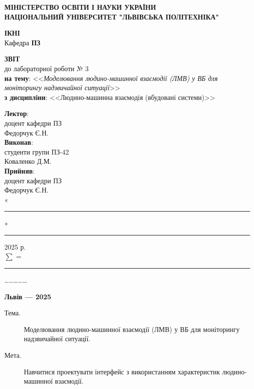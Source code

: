 \documentclass[14pt]{extreport}
\newcommand\subject{Людино-машинна взаємодія (вбудовані системи)}
\newcommand\lecturer{доцент кафедри ПЗ\\Федорчук Є.Н.}
\newcommand\teacher{доцент кафедри ПЗ\\Федорчук Є.Н.}
\newcommand\mygroup{ПЗ-42}
\newcommand\lab{3}
\newcommand\theme{Моделювання людино-машинної взаємодії (ЛМВ) у ВБ для
моніторингу надзвичайної ситуації}
\newcommand\purpose{Навчитися проектувати інтерфейс з використанням
характеристик людино-машинної взаємодії}
\begin{document}
\begin{normalsize}
	\begin{titlepage}
		\thispagestyle{empty}
		\begin{center}
			\textbf{МІНІСТЕРСТВО ОСВІТИ І НАУКИ УКРАЇНИ\\
				НАЦІОНАЛЬНИЙ УНІВЕРСИТЕТ "ЛЬВІВСЬКА ПОЛІТЕХНІКА"}
		\end{center}
		\begin{flushright}
			\textbf{ІКНІ}\\
			Кафедра \textbf{ПЗ}
		\end{flushright}
		\vspace{20pt}
		\begin{center}
			\textbf{ЗВІТ}\\
			\vspace{10pt}
			до лабораторної роботи № \lab\\
			\textbf{на тему}: <<\textit{\theme}>>\\
			\textbf{з дисципліни}: <<\subject>>
		\end{center}
		\vspace{20pt}
		\begin{flushright}
			
			\textbf{Лектор}:\\
			\lecturer\\
			\vspace{28pt}
			\textbf{Виконав}:\\
			
			студенти групи \mygroup\\
			Коваленко Д.М.\\
			\vspace{28pt}
			\textbf{Прийняв}:\\
			
			\teacher\\
			
			\vspace{28pt}
			«\rule{1cm}{0.15mm}» \rule{1.5cm}{0.15mm} 2025 р.\\
			$\sum$ = \rule{1cm}{0.15mm}……………\\
			
		\end{flushright}
		\vspace{\fill}
		\begin{center}
			\textbf{Львів — 2025}
		\end{center}
	\end{titlepage}
		
	\begin{description}
		\item[Тема.] \theme.
		\item[Мета.] \purpose.
	\end{description}


\end{normalsize}
\end{document}
